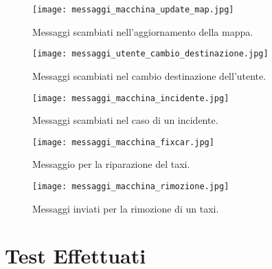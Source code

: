 \begin{figure}[htbp]
	\centering
	\texttt{[image: messaggi\_macchina\_update\_map.jpg]}
	\caption{Messaggi scambiati nell'aggiornamento della mappa.}
	\label{fig:messaggi_macchina_update_map}
\end{figure}

\begin{figure}[htbp]
	\centering
	\texttt{[image: messaggi\_utente\_cambio\_destinazione.jpg]}
	\caption{Messaggi scambiati nel cambio destinazione dell'utente.}
	\label{fig:messaggi_utente_cambio_destinazione}
\end{figure}

\begin{figure}[htbp]
	\centering
	\texttt{[image: messaggi\_macchina\_incidente.jpg]}
	\caption{Messaggi scambiati nel caso di un incidente.}
	\label{fig:messaggi_macchina_incidente}
\end{figure}

\begin{figure}[htbp]
	\centering
	\texttt{[image: messaggi\_macchina\_fixcar.jpg]}
	\caption{Messaggio per la riparazione del taxi.}
	\label{fig:messaggi_macchina_fixcar}
\end{figure}

\begin{figure}[htbp]
	\centering
	\texttt{[image: messaggi\_macchina\_rimozione.jpg]}
	\caption{Messaggi inviati per la rimozione di un taxi.}
	\label{fig:messaggi_macchina_rimozione}
\end{figure}

\chapter{Test Effettuati} \label{test_log_appendix}

